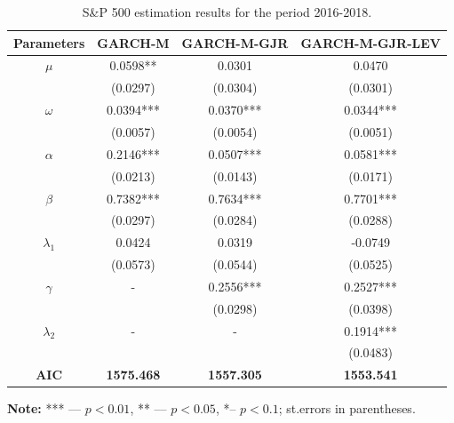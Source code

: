 \documentclass[authoryear, 1p]{elsarticle}
\numberwithin{equation}{section}
\begin{document}
\begin{table}[h!]
\begin{center}
\caption{S\&P 500 estimation results for the period 2016-2018.}
\label{tab:tab_8}
\begin{tabular*}{\textwidth}{cccc}
\hline
\hline
\textbf{Parameters} & \textbf{GARCH-M}  & \textbf{GARCH-M-GJR} & \textbf{GARCH-M-GJR-LEV} \\
\hline
\hline
$\mu$                  & 0.0598**          & 0.0301               & 0.0470                   \\
                    & (0.0297)          & (0.0304)             & (0.0301)                 \\
$\omega$               & 0.0394***         & 0.0370***            & 0.0344***                \\
                    & (0.0057)          & (0.0054)             & (0.0051)                 \\
$\alpha$               & 0.2146***         & 0.0507***            & 0.0581***                \\
                    & (0.0213)          & (0.0143)             & (0.0171)                 \\
$\beta$                & 0.7382***         & 0.7634***            & 0.7701***                \\
                    & (0.0297)          & (0.0284)             & (0.0288)                 \\
$\lambda_{1}$              & 0.0424            & 0.0319               & -0.0749                  \\
                    & (0.0573)          & (0.0544)             & (0.0525)                 \\
$\gamma$               & -                 & 0.2556***            & 0.2527***                \\
                    &                   & (0.0298)             & (0.0398)                 \\
$\lambda_{2}$           & -                 & -                    & 0.1914***                \\
                    &                   &                     & (0.0483)                 \\
\hline
\textbf{AIC}        & \textbf{1575.468} & \textbf{1557.305}    & \textbf{1553.541}        \\
\hline
\hline
\end{tabular*}
\end{center}
\footnotesize
\renewcommand{\baselineskip}{11pt}
\textbf{Note:} *** —  $p<0.01$, ** —  $p < 0.05$, *– $p < 0.1$; st.errors in parentheses.
\end{table}
\end{document}
